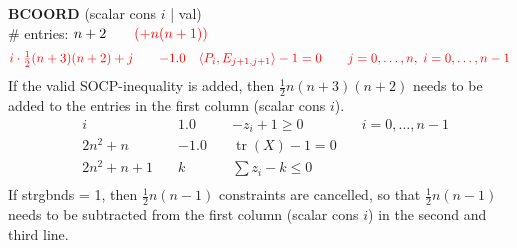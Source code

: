 \documentclass[11pt,a4paper]{article}
\DeclareMathOperator{\tr}{tr}
\theoremstyle{definition}
\begin{document}
{\textbf{BCOORD} (scalar cons $i$ | val) \\
\# entries: $n+2 \qquad {\color{red} (+n(n+1))}$ \\
\[
\begin{aligned}
  &{\color{red}i\cdot\tfrac{1}{2}(n+3)(n+2) + j} \quad & {\color{red}-1.0}
  \quad & {\color{red} \langle P_i, E_{j+1,j+1} \rangle - 1 = 0} \quad & {\color{red} j
  = 0,\dots,n,\; i = 0,\dots,n-1} \\
  \end{aligned}
\]
{\color{red} If the valid SOCP-inequality is added, then $\tfrac{1}{2}n(n+3)(n+2)$ needs
  to be added to the entries in the first column (scalar cons $i$).}
\[
  \begin{aligned}
    &i \quad & 1.0 \quad & -z_i + 1 \geq 0 \quad & i = 0,\dots,n-1 \\
    &2n^2+n \quad & -1.0 \quad & \tr(X) -1 = 0 \quad & \\
    &2n^2+n+1 \quad & k \quad & \sum z_i - k \leq 0 \quad & \\
  \end{aligned}
\]
\noindent
{\color{blue} If strgbnds = 1, then $\tfrac{1}{2}n(n-1)$ constraints are
  cancelled, so that $\tfrac{1}{2}n(n-1)$ needs to be subtracted from the
  first column (scalar cons $i$) in the second and third line.\\
}
}
\end{document}
